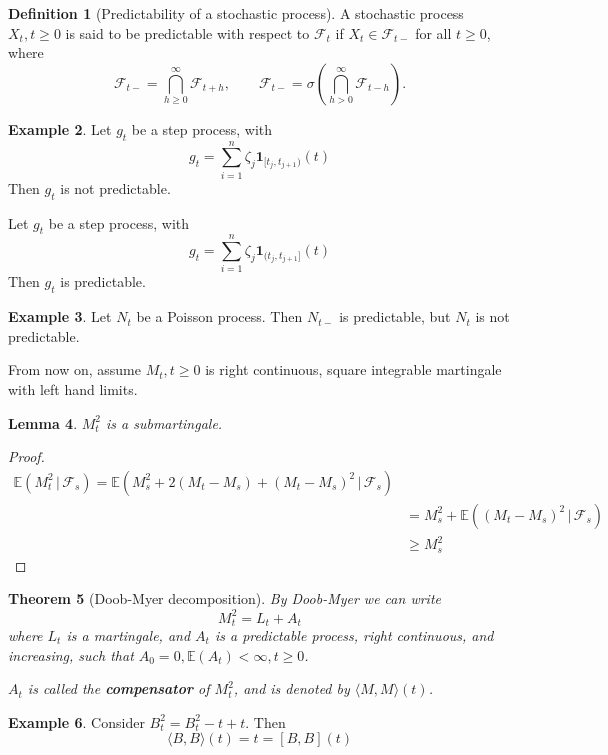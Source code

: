 \documentclass[10pt, oneside, reqno]{amsart}
\theoremstyle{plain}%
\newtheorem{thm}{Theorem}[section]
\newtheorem{lem}[thm]{Lemma}
\theoremstyle{definition}
\newtheorem{defn}[thm]{Definition}
\newtheorem{exmp}[thm]{Example}
\theoremstyle{remark}
\newcommand{\given}{ \, | \,}
\newcommand{\E}{\mathbb{E}}
\newcommand{\sigf}{\mathcal{F}}
\begin{document}
\begin{defn}[Predictability of a stochastic process]
    A stochastic process $X_t, t \geq 0$ is said to be predictable with respect to $\sigf_t$ if $X_t \in \sigf_{t-}$ for all $t \geq 0$, where \[
        \sigf_{t-} = \bigcap_{h \geq 0}^\infty \sigf_{t + h}, \qquad \sigf_{t-} = \sigma \left( \bigcap_{h > 0}^\infty \sigf_{t - h} \right).
    \] 
\end{defn}

\begin{exmp}
    Let $g_t$ be a step process, with \[
        g_t = \sum_{i=1}^n \zeta_j \mathbf{1}_{[t_j, t_{j+1})}(t)
    \] Then $g_t$ is not predictable.  
    
    Let $g_t$ be a step process, with \[
        g_t = \sum_{i=1}^n \zeta_j \mathbf{1}_{(t_j, t_{j+1}]}(t)
    \] Then $g_t$ is predictable.  
\end{exmp}

\begin{exmp}
    Let $N_t$ be a Poisson process.  Then $N_{t-}$ is predictable, but $N_t$ is not predictable.
\end{exmp}

From now on, assume $M_t, t \geq 0$ is right continuous, square integrable martingale with left hand limits.  

\begin{lem}
    $M_t^2$ is a submartingale.
\end{lem}
\begin{proof}
    \begin{align*}
        \E(M_t^2 \given \sigf_s) = \E(M_s^2 + 2(M_t - M_s) + (M_t - M_s)^2 \given \sigf_s) \\
        &= M_s^2 + \E((M_t - M_s)^2 \given \sigf_s) \\
        &\geq M_s^2
    \end{align*}
\end{proof}

\begin{thm}[Doob-Myer decomposition]
    By Doob-Myer we can write \[
        M_t^2 = L_t + A_t
    \] where $L_t$ is a martingale, and $A_t$ is a predictable process, right continuous, and increasing, such that $A_0 = 0, \E(A_t) < \infty, t \geq 0$.  
    
    $A_t$ is called the \textbf{compensator} of $M_t^2$, and is denoted by $\langle M, M \rangle(t)$.
\end{thm}
\begin{exmp}
    Consider $B_t^2 = B_t^2 - t + t$.  Then \[
        \langle B, B \rangle(t) = t = [B, B](t)
    \]
\end{exmp}
\end{document}
